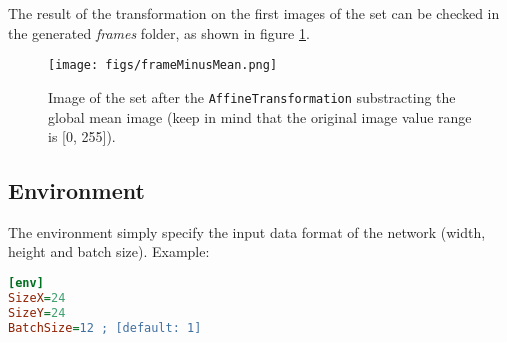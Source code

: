 \documentclass[a4paper,11pt,oneside]{article}
\begin{document}
The result of the transformation on the first images of the set can be checked
 in the generated \emph{frames} folder, as shown in figure
  \ref{fig:frameMinusMean}.

\begin{figure}[!htb]
  \centering
  \texttt{[image: figs/frameMinusMean.png]}
  \caption{Image of the set after the \lstinline!AffineTransformation!
  substracting the global mean image (keep in mind that the original image
  value range is [0, 255]).}
  \label{fig:frameMinusMean}
\end{figure}


\subsection{Environment}

The environment simply specify the input data format of the network (width,
height and batch size). Example:
\begin{lstlisting}[language=ini]
[env]
SizeX=24
SizeY=24
BatchSize=12 ; [default: 1]
\end{lstlisting}
\end{document}
